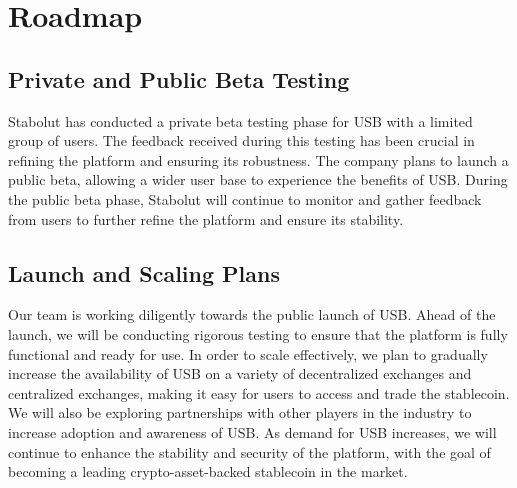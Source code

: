 \section{Roadmap}
\subsection{Private and Public Beta Testing}
Stabolut has conducted a private beta testing phase for USB with a limited group of users.
The feedback received during this testing has been crucial in refining the platform and ensuring its robustness.
The company plans to launch a public beta, allowing a wider user base to experience the benefits of USB.\newline
During the public beta phase, Stabolut will continue to monitor and gather feedback from users to further refine the platform and ensure its stability.

\subsection{Launch and Scaling Plans}
Our team is working diligently towards the public launch of USB.
Ahead of the launch, we will be conducting rigorous testing to ensure that the platform is fully functional and ready for use.\newline
In order to scale effectively, we plan to gradually increase the availability of USB on a variety of decentralized exchanges and centralized exchanges, making it easy for users to access and trade the stablecoin.
We will also be exploring partnerships with other players in the industry to increase adoption and awareness of USB.\newline
As demand for USB increases, we will continue to enhance the stability and security of the platform, with the goal of becoming a leading crypto-asset-backed stablecoin in the market.

